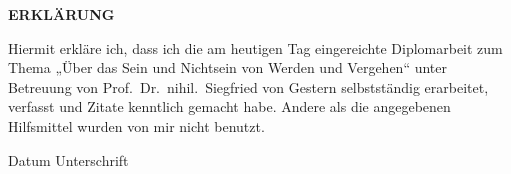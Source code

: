\documentclass{scrbook}
\begin{document}
\cleardoublepage

\thispagestyle{empty}

\hbox{}\vfill

\textbf{\large ERKLÄRUNG}

\bigskip \medskip

Hiermit erkläre ich, dass ich die am heutigen Tag eingereichte Diplomarbeit zum
Thema „Über das Sein und Nichtsein von Werden und Vergehen“ unter Betreuung von
Prof.~Dr.~nihil.~Siegfried von Gestern selbstständig erarbeitet, verfasst und
Zitate kenntlich gemacht habe. Andere als die angegebenen Hilfsmittel wurden von
mir nicht benutzt.

\vspace*{5\bigskipamount}

Datum \hfill Unterschrift

\normalsize

\vspace*{2\bigskipamount}

\vfill\hbox{}
\end{document}
